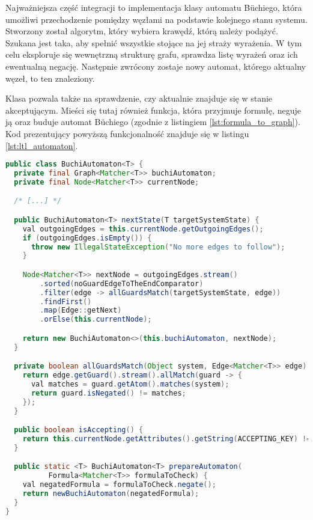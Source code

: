 Najważniejsza część integracji to implementacja klasy automatu Büchiego, która umożliwi przechodzenie pomiędzy węzłami na podstawie kolejnego stanu systemu.
Stworzony został algorytm, który wybiera krawędź, którą należy podążyć.
Szukana jest taka, aby spełnić wszystkie stojące na jej straży wyrażenia.
W tym celu eksploruje się wewnętrzną strukturę grafu, sprawdza listę wyrażeń oraz ich ewentualną negację.
Następnie zwrócony zostaje nowy automat, którego aktualny węzeł, to ten znaleziony.

Klasa pozwala także na sprawdzenie, czy aktualnie znajduje się w stanie akceptującym.
Mieści się tutaj również funkcja, która przyjmuje formułę, neguje ją oraz buduje automat Büchiego (zgodnie z listingiem \ref{lst:formula_to_graph}).
Kod prezentujący powyższą funkcjonalność znajduje się w listingu \ref{lst:ltl_automaton}.

\begin{minipage}{\linewidth}
\begin{lstlisting}[caption={Implementacja automatu Büchiego.},captionpos=b,label={lst:ltl_automaton},language=Java]
public class BuchiAutomaton<T> {
  private final Graph<Matcher<T>> buchiAutomaton;
  private final Node<Matcher<T>> currentNode;

  /* [...] */

  public BuchiAutomaton<T> nextState(T targetSystemState) {
    val outgoingEdges = this.currentNode.getOutgoingEdges();
    if (outgoingEdges.isEmpty()) {
      throw new IllegalStateException("No more edges to follow");
    }

    Node<Matcher<T>> nextNode = outgoingEdges.stream()
        .sorted(noGuardEdgeToTheEndComparator)
        .filter(edge -> allGuardsMatch(targetSystemState, edge))
        .findFirst()
        .map(Edge::getNext)
        .orElse(this.currentNode);

    return new BuchiAutomaton<>(this.buchiAutomaton, nextNode);
  }

  private boolean allGuardsMatch(Object system, Edge<Matcher<T>> edge) {
    return edge.getGuard().stream().allMatch(guard -> {
      val matches = guard.getAtom().matches(system);
      return guard.isNegated() != matches;
    });
  }

  public boolean isAccepting() {
    return this.currentNode.getAttributes().getString(ACCEPTING_KEY) != null;
  }

  public static <T> BuchiAutomaton<T> prepareAutomaton(
          Formula<Matcher<T>> formulaToCheck) {
    val negatedFormula = formulaToCheck.negate();
    return newBuchiAutomaton(negatedFormula);
  }
}

\end{lstlisting}
\end{minipage}

